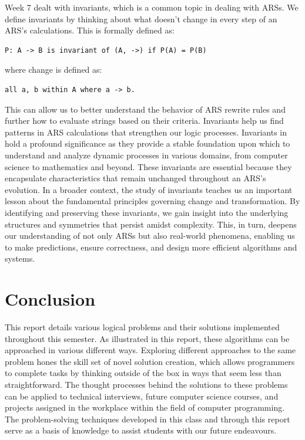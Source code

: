 \documentclass{article}
\theoremstyle{theorem}
\theoremstyle{definition}
\theoremstyle{remark}
\begin{document}
Week 7 dealt with invariants, which is a common topic in dealing with ARSs. We define invariants by thinking about what doesn't change in every step of an ARS's calculations. This is formally defined as: 
\begin{lstlisting}
P: A -> B is invariant of (A, ->) if P(A) = P(B) 
\end{lstlisting}
where change is defined as: 
\begin{lstlisting}
all a, b within A where a -> b.
\end{lstlisting}
This can allow us to better understand the behavior of ARS rewrite rules and further how to evaluate strings based on their criteria. Invariants help us find patterns in ARS  calculations that strengthen our logic processes. Invariants in hold a profound significance as they provide a stable foundation upon which to understand and analyze dynamic processes in various domains, from computer science to mathematics and beyond. These invariants are essential because they encapsulate characteristics that remain unchanged throughout an ARS's evolution. In a broader context, the study of invariants teaches us an important lesson about the fundamental principles governing change and transformation. By identifying and preserving these invariants, we gain insight into the underlying structures and symmetries that persist amidst complexity. This, in turn, deepens our understanding of not only ARSs but also real-world phenomena, enabling us to make predictions, ensure correctness, and design more efficient algorithms and systems. 

\section{Conclusion}\label{conclusions}

This report details various logical problems and their solutions implemented throughout this semester. As illustrated in this report, these algorithms can be approached in various different ways. Exploring different approaches to the same problem hones the skill set of novel solution creation, which allows programmers to complete tasks by thinking outside of the box in ways that seem less than straightforward. The thought processes behind the solutions to these problems can be applied to technical interviews, future computer science courses, and projects assigned in the workplace within the field of computer programming. The problem-solving techniques developed in this class and through this report serve as a basis of knowledge to assist students with our future endeavours. 
\end{document}
